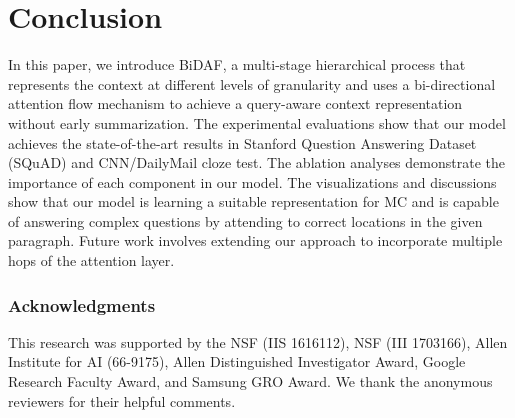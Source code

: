 \documentclass{article} \usepackage{iclr2017_conference,times}
\newcommand{\sysshort}{\mbox{\sc BiDAF}}
\begin{document}
\section{Conclusion}
In this paper, we introduce \sysshort, a multi-stage hierarchical process that represents the context at different levels of granularity and uses a bi-directional attention flow mechanism to achieve a query-aware context representation without early summarization. The experimental evaluations show that our  model achieves the state-of-the-art results in Stanford Question Answering Dataset (SQuAD) and CNN/DailyMail cloze test. The ablation analyses demonstrate the importance of each component in our model. The visualizations and discussions show that our model is learning a suitable representation for MC and is capable of answering complex questions by attending to correct locations in the given paragraph. Future work involves extending our approach to incorporate multiple hops of the attention layer. 
\subsubsection*{Acknowledgments}
This research was supported by the NSF (IIS 1616112), NSF (III 1703166), Allen Institute for AI (66-9175), Allen Distinguished Investigator Award, Google Research Faculty Award, and Samsung GRO Award. We thank the anonymous reviewers for their helpful comments.

\newpage



\newpage
\appendix
\end{document}
